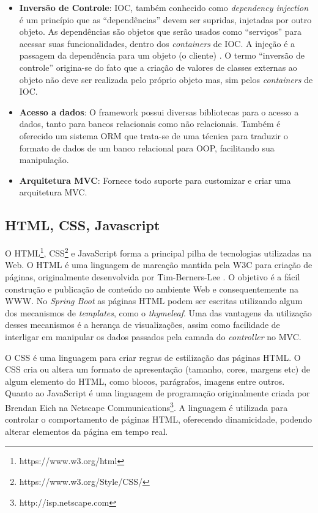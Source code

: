 \begin{itemize}
	\item{\textbf{Inversão de Controle}: \ac{IOC}, também conhecido como \textit{dependency injection} é um princípio que as “dependências” devem ser supridas, injetadas por outro objeto. As dependências são objetos que serão usados como “serviços” para acessar suas funcionalidades, dentro dos \textit{containers} de \ac{IOC}. A injeção é a passagem da dependência para um objeto (o cliente) \citep{DependencyInjection2006}. O termo “inversão de controle” origina-se do fato que a criação de valores de classes externas ao objeto não deve ser realizada pelo próprio objeto mas, sim pelos \textit{containers} de \ac{IOC}.}
	
	\item{\textbf{Acesso a dados}: O framework possui diversas bibliotecas para o acesso a dados, tanto para bancos relacionais como não relacionais. Também é oferecido um sistema \ac{ORM} que trata-se de uma técnica para traduzir o formato de dados de um banco relacional para \ac{OOP}, facilitando sua manipulação.}
	
	\item{\textbf{Arquitetura MVC}: Fornece todo suporte para customizar e criar uma arquitetura \ac{MVC}.}
\end{itemize}

\subsection{HTML, CSS, Javascript}

O HTML\footnote{https://www.w3.org/html}, \ac{CSS}\footnote{https://www.w3.org/Style/CSS/} e JavaScript forma a principal pilha de tecnologias utilizadas na Web. O HTML é uma linguagem de marcação mantida pela \ac{W3C} para criação de páginas, originalmente desenvolvida por Tim-Berners-Lee \citep{Raggett1998}. O objetivo é a fácil construção e publicação de conteúdo no ambiente Web e consequentemente na \ac{WWW}. No \textit{Spring Boot} as páginas HTML podem ser escritas utilizando algum dos mecanismos de \textit{templates}, como o \textit{thymeleaf}. Uma das vantagens da utilização desses mecanismos é a herança de visualizações, assim como facilidade de interligar em manipular os dados passados pela camada do \textit{controller} no \ac{MVC}.

O \ac{CSS} é uma linguagem para criar regras de estilização das páginas \ac{HTML}. O CSS cria ou altera um formato de apresentação (tamanho, cores, margens etc) de algum elemento do HTML, como blocos, parágrafos, imagens entre outros. Quanto ao JavaScript é uma linguagem de programação originalmente criada por Brendan Eich na Netscape Communications\footnote{ http://isp.netscape.com}. A linguagem é utilizada para controlar o comportamento de páginas HTML, oferecendo dinamicidade, podendo alterar elementos da página em tempo real.

